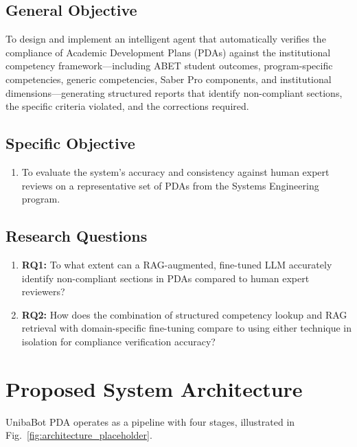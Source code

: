 \documentclass[conference]{IEEEtran}
\begin{document}
\subsection{General Objective}

To design and implement an intelligent agent that automatically verifies the compliance of Academic Development Plans (PDAs) against the institutional competency framework---including ABET student outcomes, program-specific competencies, generic competencies, Saber Pro components, and institutional dimensions---generating structured reports that identify non-compliant sections, the specific criteria violated, and the corrections required.

\subsection{Specific Objective}

\begin{enumerate}
    \item To evaluate the system's accuracy and consistency against human expert reviews on a representative set of PDAs from the Systems Engineering program.
\end{enumerate}

\subsection{Research Questions}

\begin{enumerate}
    \item \textbf{RQ1:} To what extent can a RAG-augmented, fine-tuned LLM accurately identify non-compliant sections in PDAs compared to human expert reviewers?
    \item \textbf{RQ2:} How does the combination of structured competency lookup and RAG retrieval with domain-specific fine-tuning compare to using either technique in isolation for compliance verification accuracy?
\end{enumerate}

\section{Proposed System Architecture}

UnibaBot PDA operates as a pipeline with four stages, illustrated in Fig.~\ref{fig:architecture_placeholder}.
\end{document}
